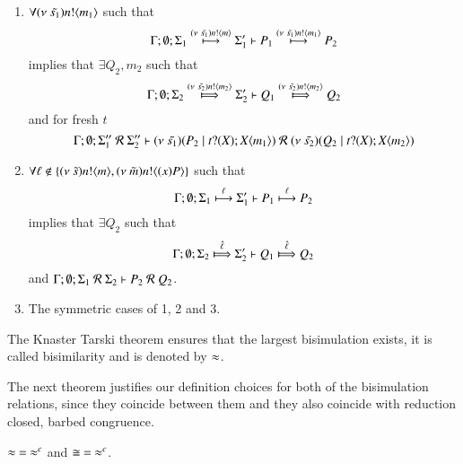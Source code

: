 \begin{definition}[Bisimulation]
\begin{enumerate}
		\item	$\forall (\nu\ \tilde{s_1}) n ! \langle m_1 \rangle$ such that
			\[
				\Gamma; \emptyset; \Sigma_1 \stackrel{(\nu\ \tilde{s_1}) n ! \langle m \rangle}{\longmapsto} \Sigma_1' \vdash P_1 \stackrel{(\nu\ \tilde{s_1}) n ! \langle m_1 \rangle}{\longmapsto} P_2
			\]
			implies that $\exists Q_2, m_2$ such that
			\[
				\Gamma; \emptyset; \Sigma_2 \Hby{\news{\tilde{s_2}} \bactout{n}{m_2}} \Sigma_2' \proves Q_1 \Hby{\news{\tilde{s_2}} \bactout{n}{m_2}} Q_2
			\]
			and for fresh $t$
			\[
				\Gamma; \emptyset; \Sigma_1''\ \mathcal{R}\ \Sigma_2'' \proves
				\newsp{\tilde{s_1}}{P_2 \Par \nametrigger{t}{m_1}}  %
				\ \mathcal{R}\ 
				\newsp{\tilde{s_2}}{Q_2 \Par \nametrigger{t}{m_2}} %
			\]

		\item	$\forall \ell \notin \{(\nu\ \tilde{s}) n ! \langle m \rangle, (\nu\ \tilde{m}) n ! \langle (x)P \rangle\}$ such that
			\[
				\Gamma; \emptyset; \Sigma_1 \stackrel{\ell}{\longmapsto} \Sigma_1' \vdash P_1 \stackrel{\ell}{\longmapsto} P_2
			\]
			implies that $\exists Q_2$ such that 
			\[
				\Gamma; \emptyset; \Sigma_2 \Hby{\hat{\ell}} \Sigma_2' \proves Q_1 \Hby{\hat{\ell}} Q_2
			\]
			and
			$\Gamma; \emptyset; \Sigma_1\ \mathcal{R}\ \Sigma_2 \vdash P_2\ \mathcal{R}\ Q_2$.

		\item	The symmetric cases of 1, 2 and 3.
	\end{enumerate}
	The Knaster Tarski theorem ensures that the largest bisimulation exists, it is called bisimilarity and is denoted by $\approx$.
\end{definition}

The next theorem justifies our definition choices
for both of the bisimulation relations, since
they coincide between them and they also
coincide with reduction closed, barbed congruence.

\begin{theorem}[Coincidence]\rm
	\label{the:coincidence}
	$\approx\ =\ \approx^{c}$ and $\cong\ =\ \approx^{c}$.
\end{theorem}


